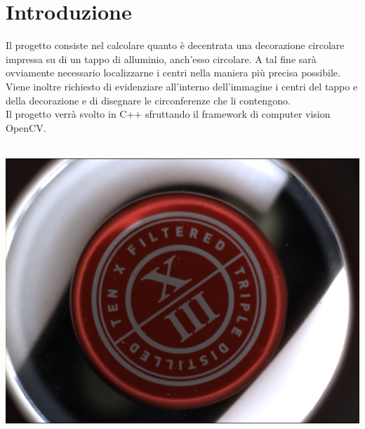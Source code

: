 \section{Introduzione}

Il progetto consiste nel calcolare quanto è decentrata una decorazione circolare impressa su di un tappo di alluminio, anch’esso circolare. A tal fine sarà ovviamente necessario localizzarne i centri nella maniera più precisa possibile. Viene inoltre richiesto di evidenziare all'interno dell'immagine i centri del tappo e della decorazione e di disegnare le circonferenze che li contengono. 
\\
Il progetto verrà svolto in C++ sfruttando il framework di computer vision OpenCV.
\\
\\
\begin{center}
\includegraphics[width=\textwidth]{img/d_06.png}
\end{center}

